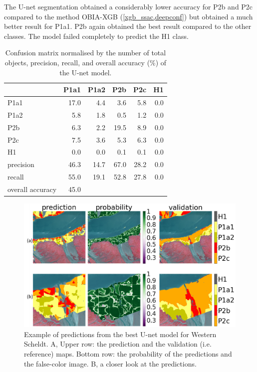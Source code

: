 \documentclass{isprs} %
\begin{document}
The U-net segmentation obtained a considerably lower accuracy for P2b and P2c compared to the method OBIA-XGB (\cref{xgb_ssac,deepconf}) but obtained a much better result for P1a1. P2b again obtained the best result compared to the other classes. The model failed completely to predict the H1 class.  

 \begin{table}
  \centering
\begin{tabular}{lrrrrr}
\toprule
{} &  P1a1 &  P1a2 &   P2b &   P2c &   H1 \\
\midrule
P1a1             &  17.0 &   4.4 &   3.6 &   5.8 &  0.0 \\
P1a2             &   5.8 &   1.8 &   0.5 &   1.2 &  0.0 \\
P2b              &   6.3 &   2.2 &  19.5 &   8.9 &  0.0 \\
P2c              &   7.5 &   3.6 &   5.3 &   6.3 &  0.0 \\
H1               &   0.0 &   0.0 &   0.1 &   0.1 
&  0.0 \\
\midrule
precision       &  46.3 &  14.7 &  67.0 &  28.2 &  0.0    \\
recall           &  55.0 &  19.1 &  52.8 &  27.8 &  0.0 \\
overall accuracy &  45.0 &       &       &       &      \\
\bottomrule
\end{tabular}
\caption{
Confusion matrix normalised by the number of total objects, precision, recall, and overall accuracy (\%) of the U-net model.}
\label{deepconf}
\end{table}

\begin{figure}
    \centering
    \includegraphics[scale=0.2]{figures/prediction_westerscheldt_merged.png}
    \caption{Example of predictions from the best U-net model for Western Scheldt. A, Upper row: the prediction and the validation (i.e. reference) maps. Bottom row: the probability of the predictions and the false-color image. B, a closer look at the predictions. }
    \label{fig:deepsp}
\end{figure}
\end{document}
